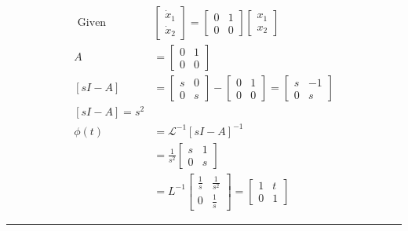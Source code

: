 \documentclass[11pt,a4paper]{article}
\begin{document}
\begin{tcolorbox}[solbox, title=Detailed Solution -- Question 92]
\[
\begin{aligned} \text { Given } &\left[\begin{array}{l} \dot{x}_{1} \\ \dot{x}_{2} \end{array}\right]=\left[\begin{array}{ll} 0 & 1 \\ 0 & 0 \end{array}\right]\left[\begin{array}{l} x_{1} \\ x_{2} \end{array}\right] \\ A &=\left[\begin{array}{ll} 0 & 1 \\ 0 & 0 \end{array}\right] \\ [s I-A] &=\left[\begin{array}{ll} s & 0 \\ 0 & s \end{array}\right]-\left[\begin{array}{ll} 0 & 1 \\ 0 & 0 \end{array}\right]=\left[\begin{array}{ll} s & -1 \\ 0 & s \end{array}\right] \\ [s I-A]=s^{2} & \\ \phi(t) &=\mathcal{L}^{-1}[s I-A]^{-1} \\ &=\frac{1}{s^{2}}\left[\begin{array}{ll} s & 1 \\ 0 & s \end{array}\right] \\ &=L^{-1}\left[\begin{array}{cc} \frac{1}{s} & \frac{1}{s^{2}} \\ 0 & \frac{1}{s} \end{array}\right]=\left[\begin{array}{ll} 1 & t \\ 0 & 1 \end{array}\right] \end{aligned}
\]
\end{tcolorbox}

\vspace{1.5em}
\hrule
\vspace{1.5em}
\end{document}
